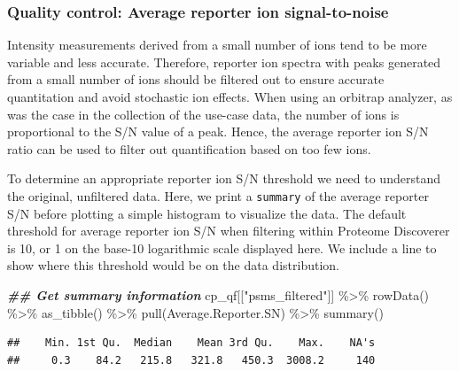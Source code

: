 \documentclass[9pt,a4paper,]{extarticle}
\newenvironment{Shaded}{\begin{snugshade}}{\end{snugshade}}
\newcommand{\DocumentationTok}[1]{\textcolor[rgb]{0.56,0.35,0.01}{\textbf{\textit{#1}}}}
\newcommand{\FunctionTok}[1]{\textcolor[rgb]{0.00,0.00,0.00}{#1}}
\newcommand{\NormalTok}[1]{#1}
\newcommand{\SpecialCharTok}[1]{\textcolor[rgb]{0.00,0.00,0.00}{#1}}
\newcommand{\StringTok}[1]{\textcolor[rgb]{0.31,0.60,0.02}{#1}}
\begin{document}
\hypertarget{quality-control-average-reporter-ion-signal-to-noise}{%
\subsubsection{Quality control: Average reporter ion signal-to-noise}\label{quality-control-average-reporter-ion-signal-to-noise}}

Intensity measurements derived from a small number of ions tend to be more
variable and less accurate. Therefore, reporter ion spectra with peaks generated
from a small number of ions should be filtered out to ensure accurate
quantitation and avoid stochastic ion effects. When using an orbitrap analyzer,
as was the case in the collection of the use-case data, the number of ions is
proportional to the S/N value of a peak. Hence, the average reporter ion S/N
ratio can be used to filter out quantification based on too few ions.

To determine an appropriate reporter ion S/N threshold we need to understand the
original, unfiltered data. Here, we print a \texttt{summary} of the average reporter
S/N before plotting a simple histogram to visualize the data. The default
threshold for average reporter ion S/N when filtering within Proteome Discoverer
is 10, or 1 on the base-10 logarithmic scale displayed here. We include a line
to show where this threshold would be on the data distribution.

\begin{Shaded}
\begin{Highlighting}[]
\DocumentationTok{\#\# Get summary information}
\NormalTok{cp\_qf[[}\StringTok{"psms\_filtered"}\NormalTok{]] }\SpecialCharTok{\%\textgreater{}\%} 
  \FunctionTok{rowData}\NormalTok{() }\SpecialCharTok{\%\textgreater{}\%} 
  \FunctionTok{as\_tibble}\NormalTok{() }\SpecialCharTok{\%\textgreater{}\%} 
  \FunctionTok{pull}\NormalTok{(Average.Reporter.SN) }\SpecialCharTok{\%\textgreater{}\%} 
  \FunctionTok{summary}\NormalTok{()}
\end{Highlighting}
\end{Shaded}

\begin{verbatim}
##    Min. 1st Qu.  Median    Mean 3rd Qu.    Max.    NA's 
##     0.3    84.2   215.8   321.8   450.3  3008.2     140
\end{verbatim}
\end{document}
